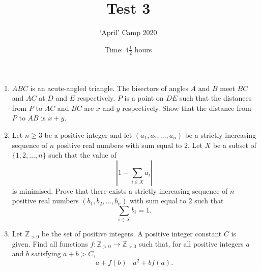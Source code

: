 \documentclass[11pt]{article}
\title{Test 3}
\author{`April' Camp 2020}
\date{Time: $4\frac{1}{2}$ hours}
\begin{document}
\maketitle
\thispagestyle{empty}


\begin{enumerate}[1.]

\vfill
\item %
$ABC$ is an acute-angled triangle.
The bisectors of angles $A$ and $B$ meet $BC$ and $AC$ at $D$ and $E$ respectively.
$P$ is a point on $DE$ such that the distances from $P$ to $AC$ and $BC$ are $x$ and $y$ respectively.
Show that the distance from $P$ to $AB$ is $x + y$.


\vfill
\item %
Let $n \geq 3$ be a positive integer and let $(a_1, a_2, \dotsc, a_n)$ be a strictly increasing sequence of $n$ positive real numbers with sum equal to $2$.
Let $X$ be a subset of $\{1, 2, \dots, n\}$ such that the value of
\[ \left| 1-\sum_{i \in X} a_i \right| \]
is minimised.
Prove that there exists a strictly increasing sequence of $n$ positive real numbers $(b_1, b_2, \dotsc, b_n)$ with sum equal to $2$ such that
\[ \sum_{i \in X} b_i = 1. \]


\vfill
\item %
\newcommand{\ZZ}{\mathbb{Z}_{>0}}
Let $\ZZ$ be the set of positive integers.
A positive integer constant $C$ is given.
Find all functions $f : \ZZ \to \ZZ$ such that, for all positive integers $a$ and $b$ satisfying $a+b > C$,
\[ a +f(b) \mid a^2 +bf(a). \]

\vfill
\end{enumerate}


\vfill
\centering
\begin{BVerbatim}
\end{BVerbatim}
\end{document}
